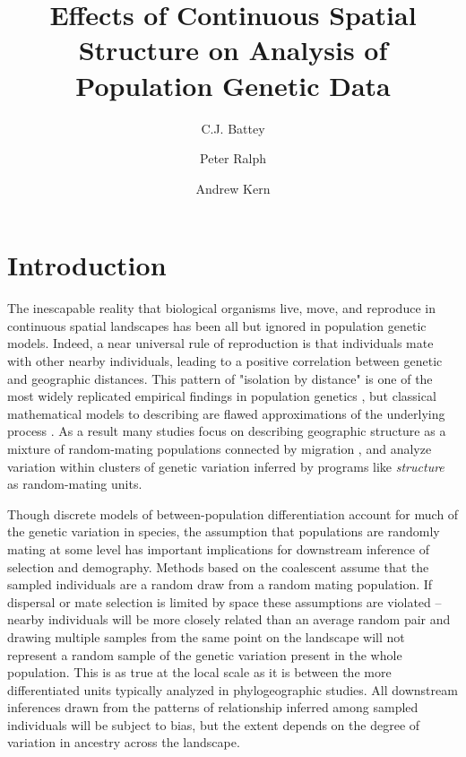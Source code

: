 \documentclass[10pt,twoside,lineno]{gsajnl}
\title{Effects of Continuous Spatial Structure on Analysis of Population Genetic Data}
\author[$\ast$,1]{C.J. Battey}
\author[$\ast$]{Peter Ralph}
\author[$\ast$]{Andrew Kern}
\affil[$\ast$]{University of Oregon Dept. Biology, Institute for Ecology Evolution}
\begin{document}
\maketitle
\thispagestyle{firststyle}
\firstpagefootnote


\vspace{-35pt}%

\section{Introduction}
The inescapable reality that biological organisms live, move, and reproduce in continuous spatial landscapes has been all but ignored in population genetic models. Indeed, a near universal rule of reproduction is that individuals mate with other nearby individuals, leading to a positive correlation between genetic and geographic distances. This pattern of "isolation by distance" \citep{Wright1943} is one of the most widely replicated empirical findings in population genetics \citep{Chen2017,Jay2012,Sharbel2000}, but classical mathematical models to describing are flawed approximations of the underlying process \citep{Felsenstein1975}.
As a result many studies focus on describing geographic structure as a mixture of random-mating populations connected by migration \citep{Malecot1948,Wright1931}, and analyze variation within clusters of genetic variation inferred by programs like \textit{structure} \citep{Pritchard2000} as random-mating units. 

Though discrete models of between-population differentiation account for much of the genetic variation in species, the assumption that populations are randomly mating at some level has important implications for downstream inference of selection and demography. Methods based on the coalescent \citep{Kingman1982} assume that the sampled individuals are a random draw from a random mating population. If dispersal or mate selection is limited by space these assumptions are violated -- nearby individuals will be more closely related than an average random pair and drawing multiple samples from the same point on the landscape will not represent a random sample of the genetic variation present in the whole population. This is as true at the local scale as it is between the more differentiated units typically analyzed in phylogeographic studies. All downstream inferences drawn from the patterns of relationship inferred among sampled individuals will be subject to bias, but the extent depends on the degree of variation in ancestry across the landscape. 
\end{document}
